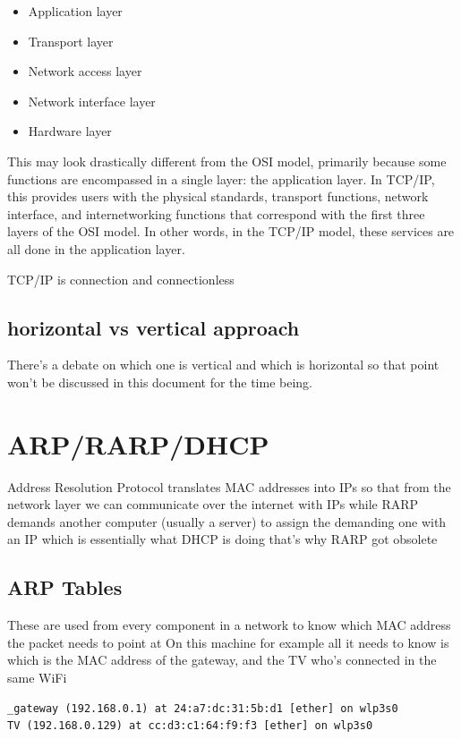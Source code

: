 \documentclass[a4paper,12pt]{article}
\begin{document}
\begin{itemize}
\item {Application layer}
\item {Transport layer}
\item {Network access layer}
\item {Network interface layer}
\item {Hardware layer}
\end{itemize}

\noindent This may look drastically different from the OSI model, primarily because some functions are encompassed in a single layer: the application layer. In TCP/IP, this provides users with the physical standards, transport functions, network interface, and internetworking functions that correspond with the first three layers of the OSI model. In other words, in the TCP/IP model, these services are all done in the application layer.

TCP/IP is connection and connectionless

\subsection{horizontal vs vertical approach}
There's a debate on which one is vertical and which is horizontal so that point won't be discussed in this document for the time being.

\section{ARP/RARP/DHCP}
Address Resolution Protocol translates MAC addresses into IPs so that from the network layer we can communicate over the internet with IPs while RARP demands another computer (usually a server) to assign the demanding one with an IP which is essentially what DHCP is doing that's why RARP got obsolete
\subsection{ARP Tables}
These are used from every component in a network to know which MAC address the packet needs to point at 
On this machine for example all it needs to know is which is the MAC address of the gateway, and the TV who's connected in the same WiFi

\begin{lstlisting}
_gateway (192.168.0.1) at 24:a7:dc:31:5b:d1 [ether] on wlp3s0
TV (192.168.0.129) at cc:d3:c1:64:f9:f3 [ether] on wlp3s0
\end{lstlisting}
\end{document}
